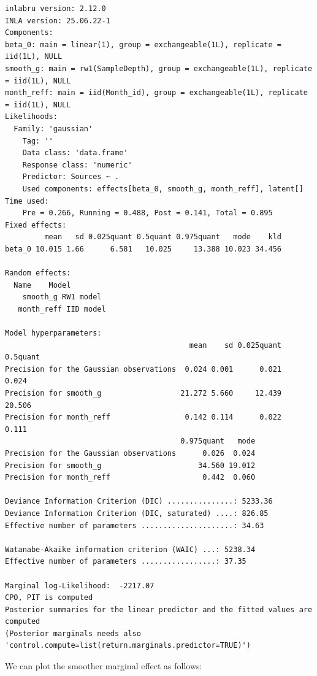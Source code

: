 \documentclass[
  letterpaper,
  DIV=11,
  numbers=noendperiod]{scrartcl}
\newenvironment{Shaded}{\begin{snugshade}}{\end{snugshade}}
\newcommand{\AttributeTok}[1]{\textcolor[rgb]{0.40,0.45,0.13}{#1}}
\newcommand{\FloatTok}[1]{\textcolor[rgb]{0.68,0.00,0.00}{#1}}
\newcommand{\FunctionTok}[1]{\textcolor[rgb]{0.28,0.35,0.67}{#1}}
\newcommand{\NormalTok}[1]{\textcolor[rgb]{0.00,0.23,0.31}{#1}}
\newcommand{\SpecialCharTok}[1]{\textcolor[rgb]{0.37,0.37,0.37}{#1}}
\newcommand{\StringTok}[1]{\textcolor[rgb]{0.13,0.47,0.30}{#1}}
\begin{document}
\begin{verbatim}
inlabru version: 2.12.0
INLA version: 25.06.22-1
Components:
beta_0: main = linear(1), group = exchangeable(1L), replicate = iid(1L), NULL
smooth_g: main = rw1(SampleDepth), group = exchangeable(1L), replicate = iid(1L), NULL
month_reff: main = iid(Month_id), group = exchangeable(1L), replicate = iid(1L), NULL
Likelihoods:
  Family: 'gaussian'
    Tag: ''
    Data class: 'data.frame'
    Response class: 'numeric'
    Predictor: Sources ~ .
    Used components: effects[beta_0, smooth_g, month_reff], latent[]
Time used:
    Pre = 0.266, Running = 0.488, Post = 0.141, Total = 0.895 
Fixed effects:
         mean   sd 0.025quant 0.5quant 0.975quant   mode    kld
beta_0 10.015 1.66      6.581   10.025     13.388 10.023 34.456

Random effects:
  Name    Model
    smooth_g RW1 model
   month_reff IID model

Model hyperparameters:
                                          mean    sd 0.025quant 0.5quant
Precision for the Gaussian observations  0.024 0.001      0.021    0.024
Precision for smooth_g                  21.272 5.660     12.439   20.506
Precision for month_reff                 0.142 0.114      0.022    0.111
                                        0.975quant   mode
Precision for the Gaussian observations      0.026  0.024
Precision for smooth_g                      34.560 19.012
Precision for month_reff                     0.442  0.060

Deviance Information Criterion (DIC) ...............: 5233.36
Deviance Information Criterion (DIC, saturated) ....: 826.85
Effective number of parameters .....................: 34.63

Watanabe-Akaike information criterion (WAIC) ...: 5238.34
Effective number of parameters .................: 37.35

Marginal log-Likelihood:  -2217.07 
CPO, PIT is computed 
Posterior summaries for the linear predictor and the fitted values are computed
(Posterior marginals needs also 'control.compute=list(return.marginals.predictor=TRUE)')
\end{verbatim}

We can plot the smoother marginal effect as follows:

\begin{Shaded}
\end{Shaded}
\end{document}
